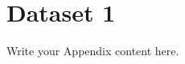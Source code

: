 \begin{comment}
 Outliers  &        53.1 &        1107 &    15.0 &                      3790.6 &          15.5 &          4.5 &        50.7 &            15.9 &            8.3 & 23454 \\
 \bottomrule
 \end{tabular}
  \label{table:d11_gmm_std}
  \caption{Cluster standard deviations (\deleven)}
  \end{table}
 \end{comment}

\section{Dataset 1}
Write your Appendix content here.